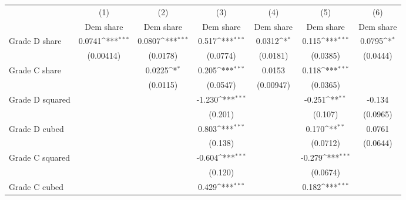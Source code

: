 {
\def\sym#1{\ifmmode^{#1}\else\(^{#1}\)\fi}
\begin{tabular}{l*{6}{c}}
\toprule
                    &\multicolumn{1}{c}{(1)}&\multicolumn{1}{c}{(2)}&\multicolumn{1}{c}{(3)}&\multicolumn{1}{c}{(4)}&\multicolumn{1}{c}{(5)}&\multicolumn{1}{c}{(6)}\\
                    &\multicolumn{1}{c}{Dem share}&\multicolumn{1}{c}{Dem share}&\multicolumn{1}{c}{Dem share}&\multicolumn{1}{c}{Dem share}&\multicolumn{1}{c}{Dem share}&\multicolumn{1}{c}{Dem share}\\
\midrule
Grade D share       &      0.0741\sym{***}&      0.0807\sym{***}&       0.517\sym{***}&      0.0312\sym{*}  &       0.115\sym{***}&      0.0795\sym{*}  \\
                    &   (0.00414)         &    (0.0178)         &    (0.0774)         &    (0.0181)         &    (0.0385)         &    (0.0444)         \\
\addlinespace
Grade C share       &                     &      0.0225\sym{*}  &       0.205\sym{***}&      0.0153         &       0.118\sym{***}&                     \\
                    &                     &    (0.0115)         &    (0.0547)         &   (0.00947)         &    (0.0365)         &                     \\
\addlinespace
Grade D squared     &                     &                     &      -1.230\sym{***}&                     &      -0.251\sym{**} &      -0.134         \\
                    &                     &                     &     (0.201)         &                     &     (0.107)         &    (0.0965)         \\
\addlinespace
Grade D cubed       &                     &                     &       0.803\sym{***}&                     &       0.170\sym{**} &      0.0761         \\
                    &                     &                     &     (0.138)         &                     &    (0.0712)         &    (0.0644)         \\
\addlinespace
Grade C squared     &                     &                     &      -0.604\sym{***}&                     &      -0.279\sym{***}&                     \\
                    &                     &                     &     (0.120)         &                     &    (0.0674)         &                     \\
\addlinespace
Grade C cubed       &                     &                     &       0.429\sym{***}&                     &       0.182\sym{***}&                     \\

\end{tabular}}
